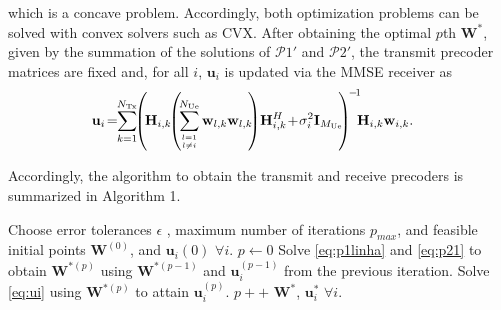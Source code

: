 \documentclass[conference,twocolumn,a4paper]{IEEEtran}
\theoremstyle{remark} \newtheorem{remark}{Remark}
\begin{document}
which is a concave problem. Accordingly, both optimization problems can be solved with convex solvers such as CVX. After obtaining the optimal $p$th $\mathbf{W}^*$, given by the summation of the solutions of $\mathcal{P}1'$ and $\mathcal{P}2'$, the transmit precoder matrices are fixed and, for all $i$, $\mathbf{u}_i$ is updated via the MMSE receiver as~\cite{7405344}
\begin{align}
         \mathbf{u}_i\!&=\!\!\sum_{k=1}^{N_{\mathrm{Tx}}}\!\!\left(\!\mathbf{H}_{i,k}\!\!\left(\!\sum_{l=1 \atop l \neq i}^{N_{\mathrm{Ue}}}\mathbf{w}_{l,k}\mathbf{w}_{l,k}\!\!\right)\!\mathbf{H}_{i,k}^H\!+\!\sigma_i^2\mathbf{I}_{M_{\mathrm{Ue}}}\!\!\right)^{\!-\!1}\!\!\!\mathbf{H}_{i,k} \mathbf{w}_{i,k}. \label{eq:ui}
     \end{align}
     
Accordingly, the algorithm to obtain the transmit and receive precoders is summarized in Algorithm 1. 
\begin{algorithm}\label{alg:CCCP}
\caption{Precoders Iterative Algorithm}
\begin{algorithmic}[1]
\footnotesize
       \State Choose error tolerances $\epsilon$ , maximum number of iterations $p_{max}$, and feasible initial points $\mathbf{W}^{(0)}$, and $\mathbf{u}_i(0)$ $\forall i$.
       \State $p \gets 0$
       \Repeat
       \State Solve \eqref{eq:p1linha} and \eqref{eq:p21} to obtain $\mathbf{W}^{*(p)}$ using $\mathbf{W}^{*(p-1)}$ and $\mathbf{u}_{i}^{(p-1)}$ from the previous iteration.
       \State Solve \eqref{eq:ui} using $\mathbf{W}^{*(p)}$ to attain $\mathbf{u}_{i}^{(p)}$.
       \State $p++$
      \State \Return $\mathbf{W}^*$, $\mathbf{u}_i^*$ $\forall i$.  
\end{algorithmic}
\end{algorithm}
\end{document}
